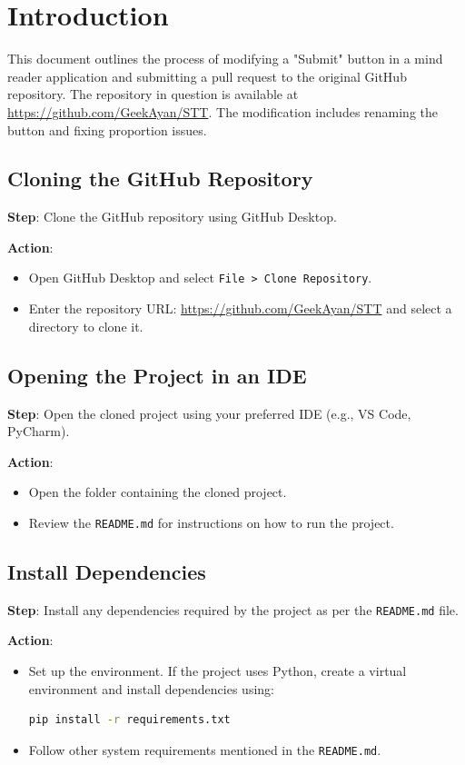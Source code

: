 \documentclass{article}
\begin{document}
\section{Introduction}
This document outlines the process of modifying a "Submit" button in a mind reader application and submitting a pull request to the original GitHub repository. The repository in question is available at \url{https://github.com/GeekAyan/STT}. The modification includes renaming the button and fixing proportion issues.

\subsection{Cloning the GitHub Repository}
\textbf{Step}: Clone the GitHub repository using GitHub Desktop.

\textbf{Action}:
\begin{itemize}
    \item Open GitHub Desktop and select \texttt{File > Clone Repository}.
    \item Enter the repository URL: \url{https://github.com/GeekAyan/STT} and select a directory to clone it.
\end{itemize}

\subsection{Opening the Project in an IDE}
\textbf{Step}: Open the cloned project using your preferred IDE (e.g., VS Code, PyCharm).

\textbf{Action}:
\begin{itemize}
    \item Open the folder containing the cloned project.
    \item Review the \texttt{README.md} for instructions on how to run the project.
\end{itemize}

\subsection{Install Dependencies}
\textbf{Step}: Install any dependencies required by the project as per the \texttt{README.md} file.

\textbf{Action}:
\begin{itemize}
    \item Set up the environment. If the project uses Python, create a virtual environment and install dependencies using:
    \begin{lstlisting}[language=bash]
    pip install -r requirements.txt
    \end{lstlisting}
    \item Follow other system requirements mentioned in the \texttt{README.md}.
\end{itemize}
\end{document}
